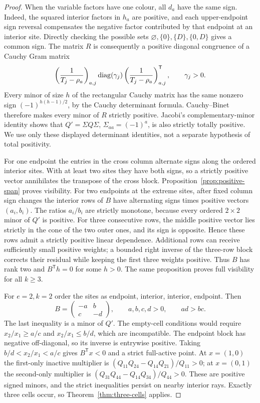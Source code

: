 \begin{proof}
When the variable factors have one colour, all $d_a$ have the same sign.
Indeed, the squared interior factors in $h_a$ are positive, and each
upper-endpoint sign reversal compensates the negative factor contributed
by that endpoint at an interior site. Directly checking the possible
sets $\varnothing,\{0\},\{D\},\{0,D\}$ gives a common sign.
The matrix $R$ is consequently a positive diagonal congruence of a
Cauchy Gram matrix
\[
 \left(\frac1{T_j-\rho_a}\right)_{a,j}
 \operatorname{diag}(\gamma_j)
 \left(\frac1{T_j-\rho_a}\right)_{a,j}^{\mathsf T},\qquad\gamma_j>0.
\]
Every minor of size $h$ of the rectangular Cauchy matrix has the same
nonzero sign $(-1)^{h(h-1)/2}$, by the Cauchy determinant formula.
Cauchy--Binet therefore makes every minor of $R$ strictly positive.
Jacobi's complementary-minor identity shows that
$Q'=\Sigma Q\Sigma$, $\Sigma_{aa}=(-1)^a$, is also strictly totally
positive. We use only these displayed determinant identities, not a
separate hypothesis of total positivity.

For one endpoint the entries in the cross column alternate signs along
the ordered interior sites. With at least two sites they have both
signs, so a strictly positive vector annihilates the transpose of the
cross block. Proposition~\ref{prop:positive-span} proves visibility.
For two endpoints at the extreme sites, after fixed column sign changes
the interior rows of $B$ have alternating signs times positive vectors
$(a_i,b_i)$. The ratios $a_i/b_i$ are strictly monotone, because every
ordered $2\times2$ minor of $Q'$ is positive. For three consecutive
rows, the middle positive vector lies strictly in the cone of the two
outer ones, and its sign is opposite. Hence these rows admit a strictly
positive linear dependence. Additional rows can receive sufficiently
small positive weights; a bounded right inverse of the three-row block
corrects their residual while keeping the first three weights positive.
Thus $B$ has rank two and $B^{\mathsf T}h=0$ for some $h>0$. The same
proposition proves full visibility for all $k\ge3$.

For $e=2,k=2$ order the sites as endpoint, interior, interior, endpoint.
Then
\[
 B=\begin{pmatrix}-a&b\\c&-d\end{pmatrix},\qquad
 a,b,c,d>0,\qquad ad>bc.
\]
The last inequality is a minor of $Q'$. The empty-cell conditions would
require $x_2/x_1\ge a/c$ and $x_2/x_1\le b/d$, which are incompatible.
The endpoint block has negative off-diagonal, so its inverse is entrywise
positive. Taking $b/d<x_2/x_1<a/c$ gives $B^{\mathsf T}x<0$ and a
strict full-active point. At $x=(1,0)$ the first-only inactive multiplier
is
$(Q_{11}Q_{24}-Q_{14}Q_{21})/Q_{11}>0$; at $x=(0,1)$ the second-only
multiplier is $(Q_{31}Q_{44}-Q_{14}Q_{34})/Q_{44}>0$.
These are positive signed minors, and the strict inequalities persist
on nearby interior rays. Exactly three cells occur, so
Theorem~\ref{thm:three-cells} applies.


\end{proof}
